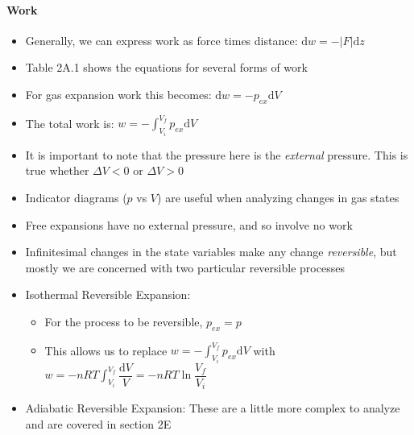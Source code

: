 \documentclass[12pt, openany, letterpaper]{memoir}
\begin{document}
\paragraph{Work}
\begin{itemize}
	\item Generally, we can express work as force times distance: $\mathrm{d}w = -\left|F\right|\mathrm{d}z$
	\item Table 2A.1 shows the equations for several forms of work
	\item For gas expansion work this becomes: $\mathrm{d}w = -p_{ex}\mathrm{d}V$
	\item The total work is: $w=-\displaystyle\int_{V_i}^{V_f}p_{ex}\mathrm{d}V$
	\item It is important to note that the pressure here is the \emph{external} pressure. This is true whether $\Delta V<0$ or $\Delta V>0$
	\item Indicator diagrams ($p$ vs $V$) are useful when analyzing changes in gas states
	\item Free expansions have no external pressure, and so involve no work
	\item Infinitesimal changes in the state variables make any change \emph{reversible}, but mostly we are concerned with two particular reversible processes
	\item Isothermal Reversible Expansion:
	\begin{itemize}
		\item For the process to be reversible, $p_{ex}=p$
		\item This allows us to replace $w=-\displaystyle\int_{V_i}^{V_f}\!p_{ex}\mathrm{d}V$ with $w=-nRT\displaystyle\int_{V_i}^{V_f}\dfrac{\mathrm{d}V}{V} = -nRT\ln\dfrac{V_f}{V_i}$
	\end{itemize}
	\item Adiabatic Reversible Expansion: These are a little more complex to analyze and are covered in section 2E
\end{itemize}
\end{document}
